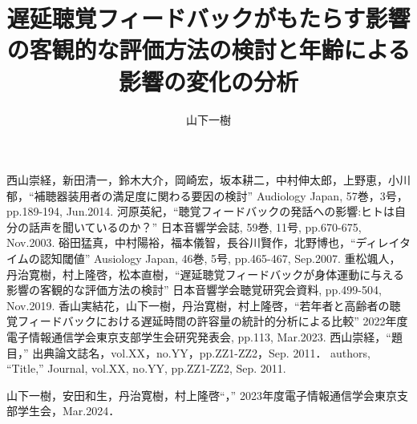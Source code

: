 \documentclass[twocolumn]{jsarticle}
\title{遅延聴覚フィードバックがもたらす影響の客観的な評価方法の検討と年齢による影響の変化の分析}
\author{山下\hspace{1zw}一樹}
\begin{document}
\maketitle









\begin{thebibliography}{99}
	西山崇経，新田清一，鈴木大介，岡崎宏，坂本耕二，中村伸太郎，上野恵，小川郁，``補聴器装用者の満足度に関わる要因の検討'' Audiology Japan, 57巻，3号，pp.189-194, Jun.2014.
	河原英紀，``聴覚フィードバックの発話への影響:ヒトは自分の話声を聞いているのか？'' 日本音響学会誌, 59巻, 11号, pp.670-675, Nov.2003.
	硲田猛真，中村陽裕，福本儀智，長谷川賢作，北野博也，``ディレイタイムの認知閾値'' Ausiology Japan, 46巻, 5号, pp.465-467, Sep.2007.
	重松颯人，丹治寛樹，村上隆啓，松本直樹，``遅延聴覚フィードバックが身体運動に与える影響の客観的な評価方法の検討'' 日本音響学会聴覚研究会資料, pp.499-504, Nov.2019.
	香山実結花，山下一樹，丹治寛樹，村上隆啓，``若年者と高齢者の聴覚フィードバックにおける遅延時間の許容量の統計的分析による比較'' 2022年度電子情報通信学会東京支部学生会研究発表会, pp.113, Mar.2023.
	西山崇経，``題目，\<'' 出典論文誌名，vol.XX，no.YY，pp.ZZ1-ZZ2，Sep. 2011．
	authors, ``Title,'' Journal, vol.XX, no.YY, pp.ZZ1-ZZ2, Sep. 2011.
\end{thebibliography}

\begin{thepublished}{99}
	山下一樹，安田和生，丹治寛樹，村上隆啓``，\<'' 2023年度電子情報通信学会東京支部学生会，Mar.2024．
\end{thepublished}
\end{document}
